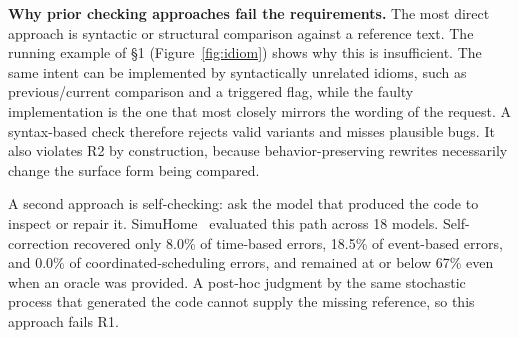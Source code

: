 \documentclass[sigconf,nonacm,anonymous,review]{acmart}
\begin{document}
\textbf{Why prior checking approaches fail the requirements.}
The most direct approach is syntactic or structural comparison against a reference text. The running example of \S1 (Figure~\ref{fig:idiom}) shows why this is insufficient. The same intent can be implemented by syntactically unrelated idioms, such as previous/current comparison and a triggered flag, while the faulty implementation is the one that most closely mirrors the wording of the request. A syntax-based check therefore rejects valid variants and misses plausible bugs. It also violates R2 by construction, because behavior-preserving rewrites necessarily change the surface form being compared.

A second approach is self-checking: ask the model that produced the code to inspect or repair it. SimuHome~\cite{simuhome} evaluated this path across 18 models. Self-correction recovered only 8.0\% of time-based errors, 18.5\% of event-based errors, and 0.0\% of coordinated-scheduling errors, and remained at or below 67\% even when an oracle was provided. A post-hoc judgment by the same stochastic process that generated the code cannot supply the missing reference, so this approach fails R1.
\end{document}
